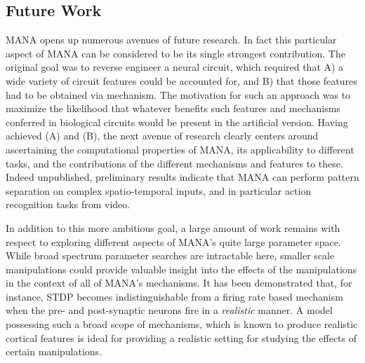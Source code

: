 \documentclass[10pt,letterpaper]{article}
\begin{document}
\subsection*{Future Work}
	 
MANA opens up numerous avenues of future research. In fact this particular aspect of MANA can be considered to be its single strongest contribution. The original goal was to reverse engineer a neural circuit, which required that A) a wide variety of circuit features could be accounted for, and B) that those features had to be obtained via mechanism. The motivation for such an approach was to maximize the likelihood that whatever benefits such features and mechanisms conferred in biological circuits would be present in the artificial version. Having achieved (A) and (B), the next avenue of research clearly centers around ascertaining the computational properties of MANA, its applicability to different tasks, and the contributions of the different mechanisms and features to these. Indeed unpublished, preliminary results indicate that MANA can perform pattern separation on complex spatio-temporal inputs, and in particular action recognition tasks from video. 
	 
In addition to this more ambitious goal, a large amount of work remains with respect to exploring different aspects of MANA's quite large parameter space. While broad spectrum parameter searches are intractable here, smaller scale manipulations could provide valuable insight into the effects of the manipulations in the context of all of MANA's mechanisms. It has been demonstrated that, for instance, STDP becomes indistinguishable from a firing rate based mechanism when the pre- and post-synaptic neurons fire in a \emph{realistic} manner\cite{graupner2016natural}. A model possessing such a broad scope of mechanisms, which is known to produce realistic cortical features is ideal for providing a realistic setting for studying the effects of certain manipulations. 
	 
\end{document}

